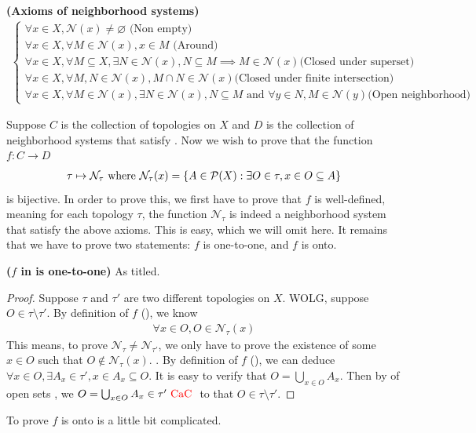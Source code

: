 \documentclass{report}
\begin{document}
\begin{axiom}
\label{1.1.1}
\textbf{(Axioms of neighborhood systems)} 
\begin{align*}
\begin{cases}
\forall x\in X, \mathcal{N}(x)\neq \varnothing \text{ (Non empty) }\\
\forall x\in X, \forall M \in \mathcal{N}(x), x \in M\text{ (Around) }\\
\forall x \in X, \forall M\subseteq X, \exists N \in \mathcal{N}(x), N\subseteq M \implies M \in \mathcal{N}(x)\text{(Closed under superset)}\\
\forall x \in X, \forall M,N \in \mathcal{N}(x), M \cap  N \in \mathcal{N}(x)\text{(Closed under finite intersection)}\\
\forall x \in X, \forall M\in \mathcal{N}(x), \exists N \in \mathcal{N}(x), N \subseteq M \text{ and } \forall y \in N, M \in \mathcal{N}(y)\text{(Open neighborhood)}
\end{cases}
\end{align*}
\end{axiom}
\begin{mdframed}
Suppose $C$ is the collection of topologies on $X$ and $D$ is the collection of neighborhood systems that satisfy . Now we wish to prove that the function $f:C\rightarrow D$
\begin{align}
\label{1.2}
\tau \mapsto  \mathcal{N}_\tau\text{ where }\mathcal{N}_\tau (x)= \{ A \in \mathcal{P}(X): \exists O \in \tau, x \in O \subseteq A \}
\end{align}
is bijective. In order to prove this, we first have to prove that $f$ is well-defined, meaning for each topology $\tau$, the function $\mathcal{N}_\tau$ is indeed a neighborhood system that satisfy the above axioms. This is easy, which we will omit here. It remains that we have to prove two statements: $f$ is one-to-one, and  $f$ is onto.
\end{mdframed}
\begin{theorem}
\label{1.1.2}
\textbf{($f$ in  is one-to-one)} As titled. 
\end{theorem}
\begin{proof}
Suppose $\tau$ and $\tau'$ are two different topologies on $X$. WOLG, suppose $O \in \tau \setminus \tau'$. By definition of $f$ (), we know 
\begin{align*}
\forall x \in O, O \in \mathcal{N}_\tau (x)
\end{align*}
This means, to prove $\mathcal{N}_\tau \neq \mathcal{N}_{\tau'}$, we only have to prove the existence of some $x \in O$ such that $O \not\in \mathcal{N}_\tau (x)$. . By definition of $f$ (), we can deduce $\forall x \in O, \exists A_x \in \tau', x \in A_x \subseteq O$. It is easy to verify that $O= \bigcup_{x\in O} A_x$. Then by  of open sets , we $O=\bigcup_{x \in O}A_x \in \tau'\text{ \textcolor{red}{CaC} }$ to that $O \in \tau \setminus \tau'$. 
\end{proof}
\begin{mdframed}
To prove $f$ is onto is a little bit complicated. 
\end{mdframed}
\end{document}
